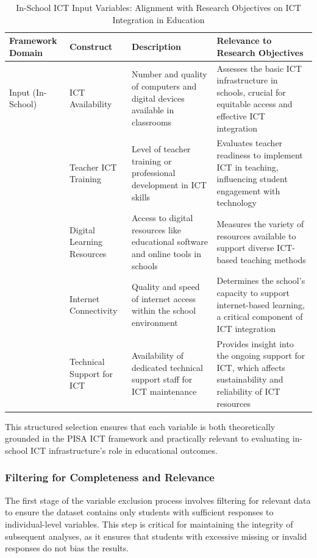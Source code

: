 \documentclass[
]{article}
\begin{document}
\begin{longtable}[t]{>{\raggedright\arraybackslash}p{2cm}>{\raggedright\arraybackslash}p{2cm}>{\raggedright\arraybackslash}p{5cm}>{\raggedright\arraybackslash}p{5.5cm}}
\caption{\label{tab:example_mapping_of_in-school_input_variables}In-School ICT Input Variables: Alignment with Research Objectives on ICT Integration in Education}\\
\toprule
Framework Domain & Construct & Description & Relevance to Research Objectives\\
\midrule
Input (In-School) & ICT Availability & Number and quality of computers and digital devices available in classrooms & Assesses the basic ICT infrastructure in schools, crucial for equitable access and effective ICT integration\\
 & Teacher ICT Training & Level of teacher training or professional development in ICT skills & Evaluates teacher readiness to implement ICT in teaching, influencing student engagement with technology\\
 & Digital Learning Resources & Access to digital resources like educational software and online tools in schools & Measures the variety of resources available to support diverse ICT-based teaching methods\\
 & Internet Connectivity & Quality and speed of internet access within the school environment & Determines the school’s capacity to support internet-based learning, a critical component of ICT integration\\
 & Technical Support for ICT & Availability of dedicated technical support staff for ICT maintenance & Provides insight into the ongoing support for ICT, which affects sustainability and reliability of ICT resources\\
\bottomrule
\end{longtable}

This structured selection ensures that each variable is both
theoretically grounded in the PISA ICT framework and practically
relevant to evaluating in-school ICT infrastructure's role in
educational outcomes.

\hypertarget{filtering-for-completeness-and-relevance}{%
\subsubsection{Filtering for Completeness and
Relevance}\label{filtering-for-completeness-and-relevance}}

The first stage of the variable exclusion process involves filtering for
relevant data to ensure the dataset contains only students with
sufficient responses to individual-level variables. This step is
critical for maintaining the integrity of subsequent analyses, as it
ensures that students with excessive missing or invalid responses do not
bias the results.
\end{document}
